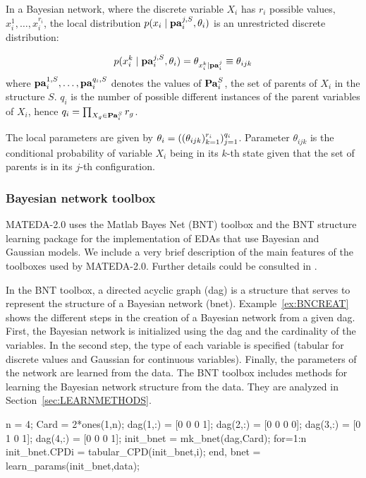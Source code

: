 \documentclass[a4paper]{article}
\begin{document}
In a Bayesian network, where the discrete variable $X_i$ has $r_i$ possible
values, $x_i^1, \ldots, x_i^{r_i}$, the local distribution
$p(x_i \mid  {\bf{pa}}_i^{j,S}, {\bf{\theta}}_i)$ is an unrestricted
discrete distribution:

\begin{equation}
p(x_i^k \mid  {\bf{pa}}_i^{j,S},{\bf{\theta}}_i) =
{\bf{\theta}}_{x_i^k \mid {\bf{pa}}_i^{j}}  \equiv \theta_{ijk}
\end{equation}
where ${\bf{pa}}_i^{1,S} , \ldots,{\bf{pa}}_i^{q_i,S}$ denotes the
values of ${\bf{Pa}}_i^{S}$, the set of parents of  ${X_i}$ in the
structure $S$. $q_i$ is the number of possible different instances
of the parent variables of $X_i$, hence $q_i = \prod_{X_g \in
  {\bf{Pa}}_i^{S}}  r_g$.

 The local parameters are given by ${\bf{\theta}}_i = ((\theta_{ijk})^{r_i}_{k=1})^{q_i}_{j=1}$. Parameter $\theta_{ijk}$
 is the conditional probability of variable $X_i$ being in its $k$-th
 state given that the set of parents is in its $j$-th configuration.



\subsubsection{Bayesian network toolbox}

MATEDA-2.0 uses the Matlab Bayes Net (BNT) toolbox
\cite{Murphy:2001} and the BNT structure learning package
\cite{Leray_and_Francois:2004} for the implementation of EDAs that
use Bayesian and Gaussian models. We include a very brief
description of the main features of the toolboxes used by MATEDA-2.0.
Further details could be consulted in
\cite{Leray_and_Francois:2004}.


In the BNT toolbox, a directed acyclic graph (dag) is a structure
that serves to represent the structure of a Bayesian network (bnet).
Example~\ref{ex:BNCREAT} shows the different steps in the creation
of a Bayesian network from a given dag. First, the Bayesian network
is initialized using the dag and the cardinality of the variables.
In the second step, the type of each variable is specified (tabular for
discrete values and Gaussian for continuous variables). Finally, the
parameters of the network are learned from the data. The BNT toolbox
includes methods for learning the Bayesian network structure from
the data. They are analyzed in Section~\ref{sec:LEARNMETHODS}.


\begin{example}
\begin{programf}
n = 4;
Card = 2*ones(1,n);
dag(1,:) = [0 0 0 1];
dag(2,:) = [0 0 0 0];
dag(3,:) = [0 1 0 1];
dag(4,:) = [0 0 0 1];
init\_bnet = mk\_bnet(dag,Card);
for=1:n
 init\_bnet.CPD{i} = tabular\_CPD(init\_bnet,i);
end,
bnet = learn\_params(init\_bnet,data);\end{programf}
\label{ex:BNCREAT} \end{example}
\end{document}

